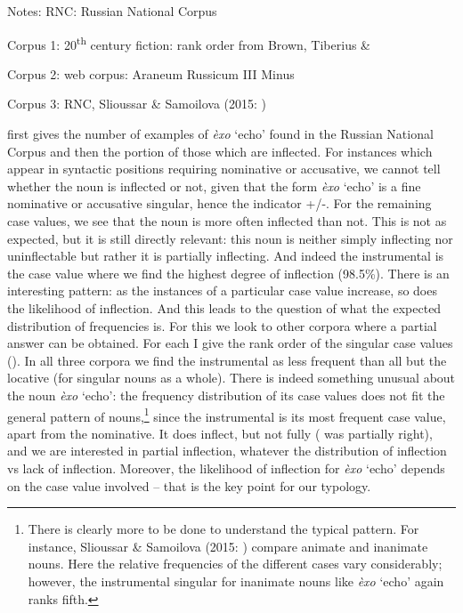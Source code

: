 \documentclass[output=paper]{langscibook}
\begin{document}
Notes:  RNC: Russian National Corpus 

Corpus 1: 20\textsuperscript{th} century fiction: rank order from Brown, Tiberius \& \citet[522]{Corbett2007} 

Corpus 2: web corpus: Araneum Russicum III Minus

Corpus 3: RNC, Slioussar \& Samoilova (2015: ) 

 first gives the number of examples of \textit{èxo} ‘echo’ found in the Russian National Corpus and then the portion of those which are inflected. For instances which appear in syntactic positions requiring nominative or accusative, we cannot tell whether the noun is inflected or not, given that the form \textit{èxo} ‘echo’ is a fine nominative or accusative singular, hence the indicator +/-. For the remaining case values, we see that the noun is more often inflected than not. This is not as expected, but it is still directly relevant: this noun is neither simply inflecting nor uninflectable but rather it is partially inflecting. And indeed the instrumental is the case value where we find the highest degree of inflection (98.5\%). There is an interesting pattern: as the instances of a particular case value increase, so does the likelihood of inflection. And this leads to the question of what the expected distribution of frequencies is. For this we look to other corpora where a partial answer can be obtained. For each I give the rank order of the singular case values (). In all three corpora we find the instrumental as less frequent than all but the locative (for singular nouns as a whole). There is indeed something unusual about the noun \textit{èxo} ‘echo’: the frequency distribution of its case values does not fit the general pattern of nouns,\footnote{ \textrm{There is clearly more to be done to understand the typical pattern. For instance, Slioussar \& Samoilova (2015: ) compare animate and inanimate nouns. Here the relative frequencies of the different cases vary considerably; however, the instrumental singular for inanimate nouns like} \textrm{\textit{èxo}} \textrm{‘echo’ again ranks fifth.} } since the instrumental is its most frequent case value, apart from the nominative. It does inflect, but not fully (\citealt{Unbegaun1947} was partially right), and we are interested in partial inflection, whatever the distribution of inflection vs lack of inflection. Moreover, the likelihood of inflection for \textit{èxo} ‘echo’ depends on the case value involved – that is the key point for our typology. 
\end{document}
